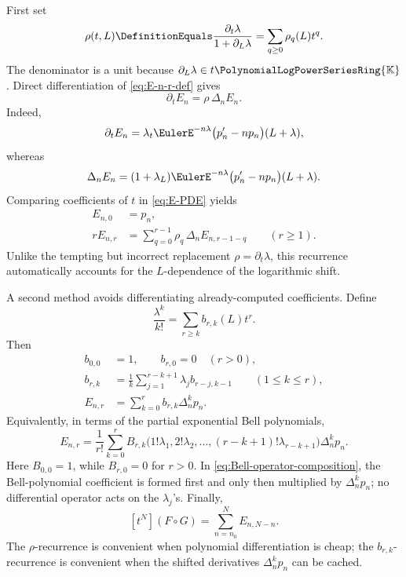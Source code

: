 \documentclass[11pt]{article}
\theoremstyle{pltheorem}
\newcommand{\K}{\mathbb K}
\newcommand{\PL}{\PolynomialLogPowerSeriesRing{\K}}
\newcommand{\compose}{\mathbin{\circ}}
\begin{document}
First set
\begin{equation}\label{eq:rho-composition}
 \rho(t,L)\DefinitionEquals\frac{\partial_t\lambda}{1+\partial_L\lambda}
 =\sum_{q\ge0}\rho_q(L)t^q.
\end{equation}
The denominator is a unit because \(\partial_L\lambda\in t\PL\).  Direct
differentiation of \cref{eq:E-n-r-def} gives
\begin{equation}\label{eq:E-PDE}
 \partial_tE_n=\rho\,\Delta_nE_n.
\end{equation}
Indeed,
\[
 \partial_tE_n=\lambda_t\EulerE^{-n\lambda}
 \bigl(p_n'-np_n\bigr)(L+\lambda),
\]
whereas
\[
 \Delta_nE_n=(1+\lambda_L)\EulerE^{-n\lambda}
 \bigl(p_n'-np_n\bigr)(L+\lambda).
\]
Comparing coefficients of \(t\) in \cref{eq:E-PDE} yields
\begin{align}
 E_{n,0}&=p_n,\label{eq:E-rec-0}\\
 rE_{n,r}&=\sum_{q=0}^{r-1}\rho_q\,\Delta_nE_{n,r-1-q}
 \qquad(r\ge1).\label{eq:E-rec-r}
\end{align}
Unlike the tempting but incorrect replacement
\(\rho=\partial_t\lambda\), this recurrence automatically accounts for
the \(L\)-dependence of the logarithmic shift.

A second method avoids differentiating already-computed coefficients.  Define
\begin{equation}\label{eq:b-r-k-def}
 \frac{\lambda^k}{k!}=\sum_{r\ge k}b_{r,k}(L)t^r.
\end{equation}
Then
\begin{align}
 b_{0,0}&=1,\qquad b_{r,0}=0\quad(r>0),\label{eq:b-boundary}\\
 b_{r,k}&=\frac1k\sum_{j=1}^{r-k+1}
 \lambda_jb_{r-j,k-1}
 \qquad(1\le k\le r),\label{eq:b-recurrence}\\
 E_{n,r}&=\sum_{k=0}^{r}b_{r,k}\Delta_n^kp_n.\label{eq:E-from-b}
\end{align}
Equivalently, in terms of the partial exponential Bell polynomials,
\begin{equation}\label{eq:Bell-operator-composition}
 E_{n,r}=\frac1{r!}\sum_{k=0}^{r}
 B_{r,k}\bigl(1!\lambda_1,2!\lambda_2,\ldots,
 (r-k+1)!\lambda_{r-k+1}\bigr)\Delta_n^kp_n.
\end{equation}
Here \(B_{0,0}=1\), while \(B_{r,0}=0\) for \(r>0\).
In \cref{eq:Bell-operator-composition}, the Bell-polynomial coefficient
is formed first and only then multiplied by \(\Delta_n^kp_n\); no
differential operator acts on the \(\lambda_j\)'s.  Finally,
\begin{equation}\label{eq:compose-from-E}
 [t^N](F\compose G)=\sum_{n=n_0}^{N}E_{n,N-n}.
\end{equation}
The \(\rho\)-recurrence is convenient when polynomial differentiation is
cheap; the \(b_{r,k}\)-recurrence is convenient when the shifted
derivatives \(\Delta_n^kp_n\) can be cached.
\end{document}

